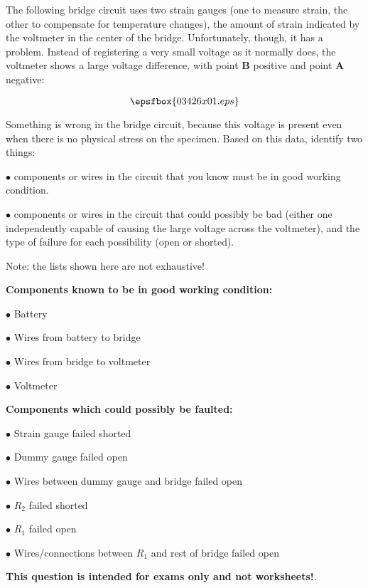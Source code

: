 

The following bridge circuit uses two strain gauges (one to measure strain, the other to compensate for temperature changes), the amount of strain indicated by the voltmeter in the center of the bridge.  Unfortunately, though, it has a problem.  Instead of registering a very small voltage as it normally does, the voltmeter shows a large voltage difference, with point {\bf B} positive and point {\bf A} negative:

$$\epsfbox{03426x01.eps}$$

\goodbreak
Something is wrong in the bridge circuit, because this voltage is present even when there is no physical stress on the specimen.  Based on this data, identify two things:

\vskip 10pt

\medskip
\item{$\bullet$}  components or wires in the circuit that you know must be in good working condition.
\vskip 40pt
\item{$\bullet$}  components or wires in the circuit that could possibly be bad (either one independently capable of causing the large voltage across the voltmeter), and the type of failure for each possibility (open or shorted).
\medskip







Note: the lists shown here are not exhaustive!

\vskip 10pt

\goodbreak
\noindent
{\bf Components known to be in good working condition:}

\medskip
\item{$\bullet$} Battery
\item{$\bullet$} Wires from battery to bridge
\item{$\bullet$} Wires from bridge to voltmeter
\item{$\bullet$} Voltmeter
\medskip

\vskip 10pt

\goodbreak
\noindent
{\bf Components which could possibly be faulted:}

\medskip
\item{$\bullet$} Strain gauge failed shorted
\item{$\bullet$} Dummy gauge failed open
\item{$\bullet$} Wires between dummy gauge and bridge failed open
\item{$\bullet$} $R_2$ failed shorted
\item{$\bullet$} $R_1$ failed open
\item{$\bullet$} Wires/connections between $R_1$ and rest of bridge failed open
\medskip







{\bf This question is intended for exams only and not worksheets!}.



